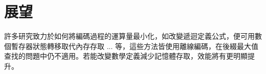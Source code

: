 \section{展望}
\label{sec:Feature}

許多研究致力於如何將編碼過程的運算量最小化，如改變遞迴定義公式，便可用數個暫存器狀態轉移取代內存存取 ... 等，這些方法皆使用離線編碼，在後綴最大值查找的問題中仍不適用。若能改變數學定義減少記憶體存取，效能將有更明顯提升。